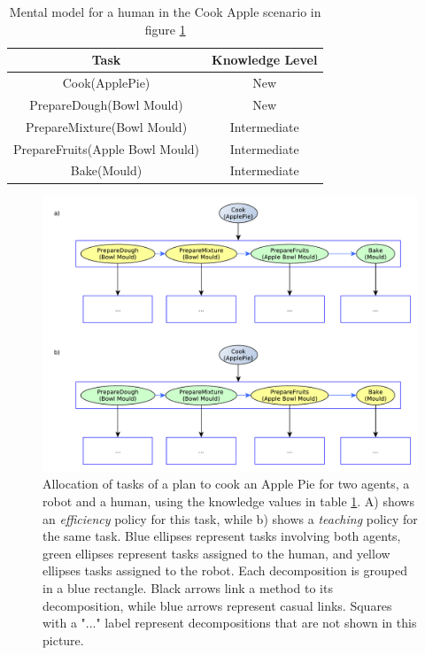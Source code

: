  
 \begin{table}
\centering
\scriptsize
\renewcommand{\arraystretch}{1.3}
\begin{tabular}{|c|c|}
\hline
Task & Knowledge Level \\ \hline \hline
Cook(ApplePie) & New \\ \hline
PrepareDough(Bowl Mould) & New \\ \hline
PrepareMixture(Bowl Mould) & Intermediate \\ \hline
PrepareFruits(Apple Bowl Mould) & Intermediate \\ \hline
Bake(Mould) & Intermediate \\ 
\hline
\end{tabular}
\caption[Mental model for a human in the Cook Apple
 scenario.]{Mental model for a human in the Cook Apple
 scenario in figure \ref{fig:knowledge-adapting_plan_knowledge} }
 \label{table:knowledge-apple_pie_human_knowledge}    
\end{table}



\begin{figure}[ht!]
 \centering
  \includegraphics[scale=0.5]{img/teacher/adapting_plan_knowledge.pdf}
 \caption[Allocation of tasks of a plan to cook an Apple Pie for two agents]{Allocation of tasks of a plan to cook an Apple Pie for two agents, a robot and a human, using the knowledge values in table \ref{table:knowledge-apple_pie_human_knowledge}. A) shows an \textit{efficiency} policy for this task, while b) shows a \textit{teaching} policy for the same task. Blue ellipses represent tasks involving both agents, green ellipses represent tasks assigned to the human, and yellow ellipses tasks assigned to the robot. Each decomposition is grouped in a blue rectangle. Black arrows link a method to its decomposition, while blue arrows represent casual links. Squares with a "..." label represent decompositions that are not shown in this picture.}
 \label{fig:knowledge-adapting_plan_knowledge}
 \end{figure}



